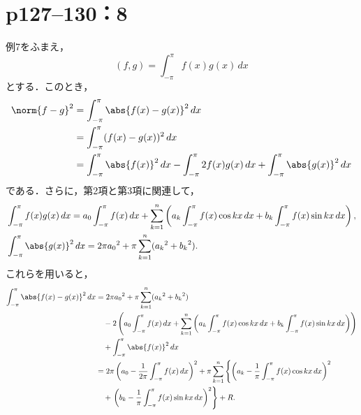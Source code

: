 \section*{p127--130：8}

\begin{tanswer}
  例7をふまえ，
  \[
    (f, g) = \int_{-\pi}^{\pi} f(x) g(x) \, dx
  \]
  とする．このとき，
  \begin{align*}
    \norm{f-g}^2 & = \int_{-\pi}^{\pi} \abs{f(x) - g(x)}^2 \, dx                                                                       \\
                 & = \int_{-\pi}^{\pi} (f(x)-g(x))^2 \, dx                                                                             \\
                 & = \int_{-\pi}^{\pi} \abs{f(x)}^2 \,dx - \int_{-\pi}^{\pi} 2 f(x) g(x) \, dx + \int_{-\pi}^{\pi} \abs{g(x)}^2 \,  dx
  \end{align*}
  である．さらに，第2項と第3項に関連して，
  \begin{align*}
     & \int_{-\pi}^{\pi} f(x) g(x)  \, dx = a_0 \int_{-\pi}^{\pi} f(x) \,  dx + \sum_{k=1}^{n} \left( a_k \int_{-\pi}^{\pi} f(x) \cos kx \, dx + b_k \int_{-\pi}^{\pi} f(x) \sin kx \, dx \right), \\
     & \int_{-\pi}^{\pi} \abs{g(x)}^2 \,dx = 2\pi {a_0}^2 + \pi \sum_{k=1}^{n} ({a_k}^2 + {b_k}^2).
  \end{align*}
  これらを用いると，
  \begin{align*}
    \int_{-\pi}^{\pi} \abs{f(x) - g(x)}^2 \, dx
     & = 2\pi {a_0}^2 + \pi \sum_{k=1}^{n} ({a_k}^2 + {b_k}^2)                                                     \\
     & \quad - 2 \left( a_0 \int_{-\pi}^{\pi} f(x) \, dx
    + \sum_{k=1}^{n} \left( a_k \int_{-\pi}^{\pi} f(x) \cos kx \, dx
    + b_k \int_{-\pi}^{\pi} f(x) \sin kx \, dx \right) \right)                                                     \\
     & \quad + \int_{-\pi}^{\pi} \abs{f(x)}^2 \, dx                                                                \\
     & = 2\pi \left( a_0 - \frac{1}{2\pi} \int_{-\pi}^{\pi} f(x) \, dx \right)^2
    + \pi \sum_{k=1}^{n} \left\{ \left( a_k - \frac{1}{\pi} \int_{-\pi}^{\pi} f(x) \cos kx \, dx \right)^2 \right. \\
     & \quad + \left. \left( b_k - \frac{1}{\pi} \int_{-\pi}^{\pi} f(x) \sin kx \, dx \right)^2 \right\} + R.
  \end{align*}


\end{tanswer}
